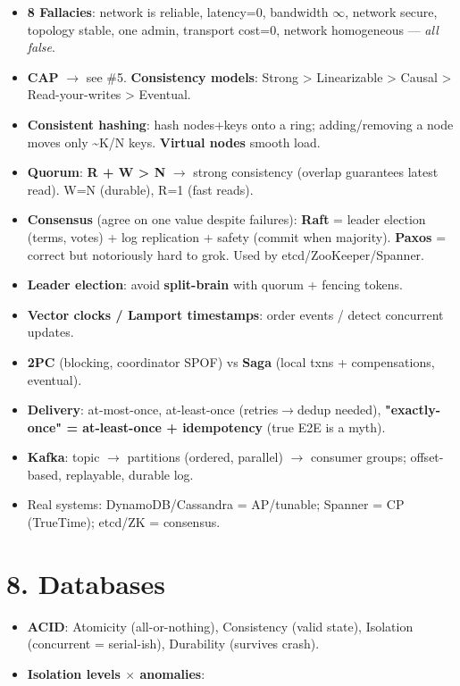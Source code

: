 \documentclass[11pt]{article}
\providecommand{\tightlist}{\setlength{\itemsep}{1pt}\setlength{\parskip}{0pt}}
\begin{document}
\begin{itemize}
\tightlist
\item
  \textbf{8 Fallacies}: network is reliable, latency=0, bandwidth \(\infty\), network secure, topology stable, one admin, transport cost=0, network homogeneous --- \emph{all false}.
\item
  \textbf{CAP} \(\rightarrow\) see \#5. \textbf{Consistency models}: Strong \textgreater{} Linearizable \textgreater{} Causal \textgreater{} Read-your-writes \textgreater{} Eventual.
\item
  \textbf{Consistent hashing}: hash nodes+keys onto a ring; adding/removing a node moves only \textasciitilde K/N keys. \textbf{Virtual nodes} smooth load.
\item
  \textbf{Quorum}: \textbf{R + W \textgreater{} N} \(\rightarrow\) strong consistency (overlap guarantees latest read). W=N (durable), R=1 (fast reads).
\item
  \textbf{Consensus} (agree on one value despite failures): \textbf{Raft} = leader election (terms, votes) + log replication + safety (commit when majority). \textbf{Paxos} = correct but notoriously hard to grok. Used by etcd/ZooKeeper/Spanner.
\item
  \textbf{Leader election}: avoid \textbf{split-brain} with quorum + fencing tokens.
\item
  \textbf{Vector clocks / Lamport timestamps}: order events / detect concurrent updates.
\item
  \textbf{2PC} (blocking, coordinator SPOF) vs \textbf{Saga} (local txns + compensations, eventual).
\item
  \textbf{Delivery}: at-most-once, at-least-once (retries\(\rightarrow\)dedup needed), \textbf{"exactly-once" = at-least-once + idempotency} (true E2E is a myth).
\item
  \textbf{Kafka}: topic \(\rightarrow\) partitions (ordered, parallel) \(\rightarrow\) consumer groups; offset-based, replayable, durable log.
\item
  Real systems: DynamoDB/Cassandra = AP/tunable; Spanner = CP (TrueTime); etcd/ZK = consensus.
\end{itemize}

\section{8. Databases}\label{8-databases}

\begin{itemize}
\tightlist
\item
  \textbf{ACID}: Atomicity (all-or-nothing), Consistency (valid state), Isolation (concurrent = serial-ish), Durability (survives crash).
\item
  \textbf{Isolation levels \(\times\) anomalies}:
\end{itemize}
\end{document}
